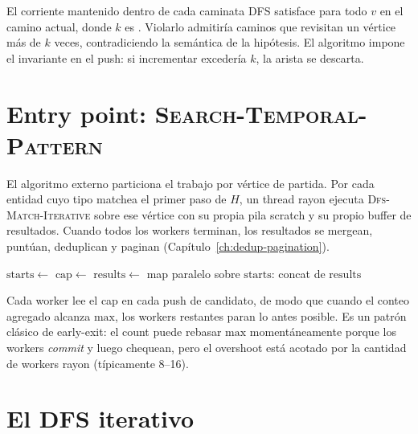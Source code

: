 \begin{invariant}[$k$-simplicidad]
El  corriente mantenido
dentro de cada caminata DFS satisface 
para todo $v$ en el camino actual, donde $k$ es
. Violarlo admitiría caminos que
revisitan un vértice más de $k$ veces, contradiciendo la
semántica de la hipótesis. El algoritmo impone el invariante en
el push: si incrementar  excedería $k$,
la arista se descarta.
\end{invariant}

\section{Entry point: \textsc{Search-Temporal-Pattern}}

El algoritmo externo particiona el trabajo por vértice de
partida. Por cada entidad cuyo tipo matchea el primer paso de
$H$, un thread rayon ejecuta \textsc{Dfs-Match-Iterative} sobre
ese vértice con su propia pila scratch y su propio buffer de
resultados. Cuando todos los workers terminan, los resultados se
mergean, puntúan, deduplican y paginan
(Capítulo~\ref{ch:dedup-pagination}).

\begin{algorithm}
\caption{\textsc{Search-Temporal-Pattern}}\label{alg:search-entry}
$\mathrm{starts} \gets $ \;
$\mathrm{cap} \gets $ \;
$\mathrm{results} \gets $ map paralelo sobre $\mathrm{starts}$:
\Return concat de $\mathrm{results}$\;
\end{algorithm}

Cada worker lee el  cap en cada push de
candidato, de modo que cuando el conteo agregado alcanza
$\mathrm{max}$, los workers restantes paran lo antes posible. Es
un patrón clásico de early-exit: el count puede rebasar
$\mathrm{max}$ momentáneamente porque los workers \emph{commit}
y luego chequean, pero el overshoot está acotado por la cantidad
de workers rayon (típicamente 8--16).

\section{El DFS iterativo}

